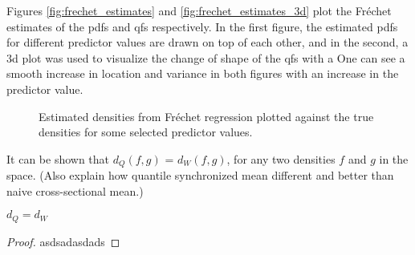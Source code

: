 Figures \ref{fig:frechet_estimates} and \ref{fig:frechet_estimates_3d} plot the Fréchet
estimates of the pdfs and qfs respectively. In the first figure, the estimated pdfs for
different predictor values are drawn on top of each other, and in the second, a 3d plot
was used to visualize the change of shape of the qfs with a One can see a smooth
increase in location and variance in both figures with an increase in the predictor
value.


\begin{figure}[h]
    \centering
    \resizebox{1\textwidth}{!}{}
    \caption[Comparison: estimated vs. true densities --- Fréchet]{Estimated
    densities from Fréchet regression plotted against the true densities for some selected
    predictor values.}
    \label{fig:frechet_est_vs_true}
\end{figure}

It can be shown that $d_Q(f,g)$ = $d_W(f,g)$, for any two densities $f$ and $g$ in the
space. (Also explain how quantile synchronized mean different and better than naive
cross-sectional mean.)
\begin{lemma}
    \label{lemma:dqeqdw}
    $d_Q = d_W$
\end{lemma}
\begin{proof}
    asdsadasdads
\end{proof}

